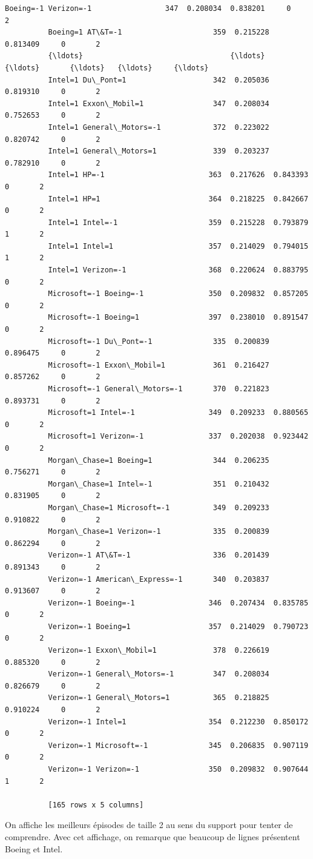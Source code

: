 \documentclass[11pt]{article}
\begin{document}
\begin{Verbatim}[commandchars=\\\{\}]
          Boeing=-1 Verizon=-1                 347  0.208034  0.838201     0       2
          Boeing=1 AT\&T=-1                     359  0.215228  0.813409     0       2
          {\ldots}                                  {\ldots}       {\ldots}       {\ldots}   {\ldots}     {\ldots}
          Intel=1 Du\_Pont=1                    342  0.205036  0.819310     0       2
          Intel=1 Exxon\_Mobil=1                347  0.208034  0.752653     0       2
          Intel=1 General\_Motors=-1            372  0.223022  0.820742     0       2
          Intel=1 General\_Motors=1             339  0.203237  0.782910     0       2
          Intel=1 HP=-1                        363  0.217626  0.843393     0       2
          Intel=1 HP=1                         364  0.218225  0.842667     0       2
          Intel=1 Intel=-1                     359  0.215228  0.793879     1       2
          Intel=1 Intel=1                      357  0.214029  0.794015     1       2
          Intel=1 Verizon=-1                   368  0.220624  0.883795     0       2
          Microsoft=-1 Boeing=-1               350  0.209832  0.857205     0       2
          Microsoft=-1 Boeing=1                397  0.238010  0.891547     0       2
          Microsoft=-1 Du\_Pont=-1              335  0.200839  0.896475     0       2
          Microsoft=-1 Exxon\_Mobil=1           361  0.216427  0.857262     0       2
          Microsoft=-1 General\_Motors=-1       370  0.221823  0.893731     0       2
          Microsoft=1 Intel=-1                 349  0.209233  0.880565     0       2
          Microsoft=1 Verizon=-1               337  0.202038  0.923442     0       2
          Morgan\_Chase=1 Boeing=1              344  0.206235  0.756271     0       2
          Morgan\_Chase=1 Intel=-1              351  0.210432  0.831905     0       2
          Morgan\_Chase=1 Microsoft=-1          349  0.209233  0.910822     0       2
          Morgan\_Chase=1 Verizon=-1            335  0.200839  0.862294     0       2
          Verizon=-1 AT\&T=-1                   336  0.201439  0.891343     0       2
          Verizon=-1 American\_Express=-1       340  0.203837  0.913607     0       2
          Verizon=-1 Boeing=-1                 346  0.207434  0.835785     0       2
          Verizon=-1 Boeing=1                  357  0.214029  0.790723     0       2
          Verizon=-1 Exxon\_Mobil=1             378  0.226619  0.885320     0       2
          Verizon=-1 General\_Motors=-1         347  0.208034  0.826679     0       2
          Verizon=-1 General\_Motors=1          365  0.218825  0.910224     0       2
          Verizon=-1 Intel=1                   354  0.212230  0.850172     0       2
          Verizon=-1 Microsoft=-1              345  0.206835  0.907119     0       2
          Verizon=-1 Verizon=-1                350  0.209832  0.907644     1       2
          
          [165 rows x 5 columns]
\end{Verbatim}
            
    On affiche les meilleurs épisodes de taille 2 au sens du support pour
tenter de comprendre. Avec cet affichage, on remarque que beaucoup de
lignes présentent Boeing et Intel.


    
    
    
    
\end{document}

